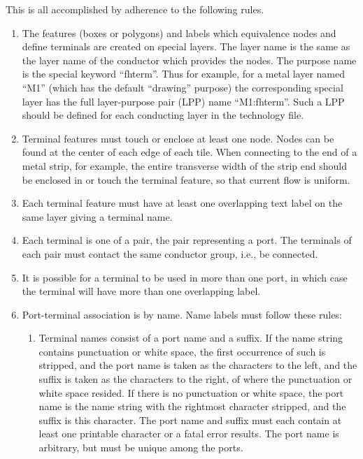 This is all accomplished by adherence to the following rules.

\begin{enumerate}
\item{The features (boxes or polygons) and labels which equivalence
nodes and define terminals are created on special layers.  The layer
name is the same as the layer name of the conductor which provides the
nodes.  The purpose name is the special keyword ``{\vt fhterm}''. 
Thus for example, for a metal layer named ``{\vt M1}'' (which has the
default ``{\vt drawing}'' purpose) the corresponding special layer has
the full layer-purpose pair (LPP) name ``{\vt M1:fhterm}''.  Such a
LPP should be defined for each conducting layer in the technology
file.}

\item{Terminal features must touch or enclose at least one node. 
Nodes can be found at the center of each edge of each tile.  When
connecting to the end of a metal strip, for example, the entire
transverse width of the strip end should be enclosed in or touch the
terminal feature, so that current flow is uniform.}

\item{Each terminal feature must have at least one overlapping text label
on the same layer giving a terminal name.}

\item{Each terminal is one of a pair, the pair representing a port. 
The terminals of each pair must contact the same conductor group,
i.e., be connected.}

\item{It is possible for a terminal to be used in more than one port,
in which case the terminal will have more than one overlapping label.}

\item{Port-terminal association is by name.  Name labels must follow
these rules:
\begin{enumerate}
\item{Terminal names consist of a port name and a suffix.  If the name
string contains punctuation or white space, the first occurrence of
such is stripped, and the port name is taken as the characters to the
left, and the suffix is taken as the characters to the right, of where
the punctuation or white space resided.  If there is no punctuation or
white space, the port name is the name string with the rightmost
character stripped, and the suffix is this character.  The port name
and suffix must each contain at least one printable character or a
fatal error results.  The port name is arbitrary, but must be unique
among the ports.}


\end{enumerate}}
\end{enumerate}
